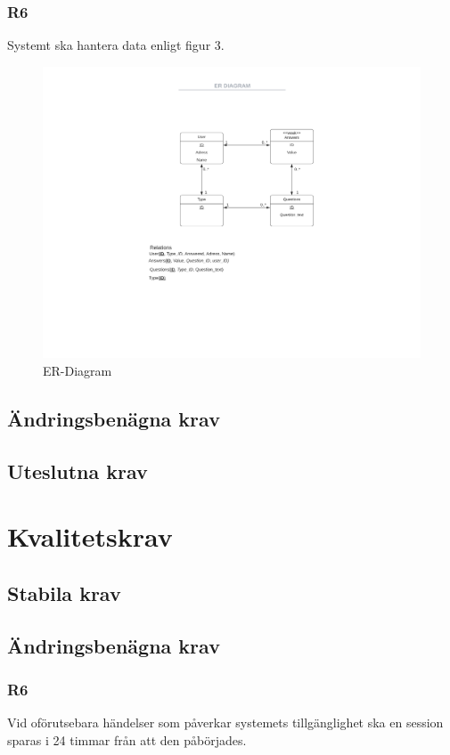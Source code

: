 \documentclass{article}
\begin{document}
    \subsubsection*{R6}
    Systemt ska hantera data enligt figur 3.
       \begin{figure}[h!]
    
    \includegraphics[width=150mm]{ERDIAGRAM.png}
    \caption{ER-Diagram}
    \end{figure}
    
    \newpage
    \subsection*{Ändringsbenägna krav}
    \subsection*{Uteslutna krav}
    
  
   
    \section{Kvalitetskrav}
    \subsection*{Stabila krav}
    
  
     \subsection*{Ändringsbenägna krav}
     \subsubsection*{R6}
     Vid oförutsebara händelser som påverkar systemets tillgänglighet ska en session sparas i 24 timmar från att den påbörjades.
     
\end{document}
